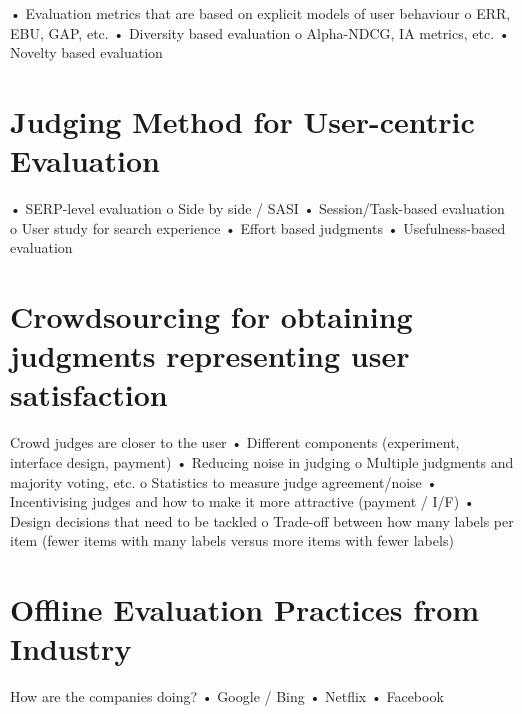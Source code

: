 \documentclass[openany]{now} %
\begin{document}
•	Evaluation metrics that are based on explicit models of user behaviour
	o	ERR, EBU, GAP, etc.
•	Diversity based evaluation
	o	Alpha-NDCG, IA metrics, etc.
•	Novelty based evaluation

\chapter{Judging Method for User-centric Evaluation}
•	SERP-level evaluation 
	o	Side by side / SASI \cite{Chandar2013}
•	Session/Task-based evaluation
	o	User study for search experience
•	Effort based judgments
•	Usefulness-based evaluation

\chapter{Crowdsourcing for obtaining judgments representing user satisfaction}

Crowd judges are closer to the user
•	Different components (experiment, interface design, payment)
•	Reducing noise in judging
	o	Multiple judgments and majority voting, etc.
	o	Statistics to measure judge agreement/noise
•	Incentivising judges and how to make it more attractive (payment / I/F)
•	Design decisions that need to be tackled
	o	Trade-off between how many labels per item 
		(fewer items with many labels versus more items with fewer labels)

\chapter{Offline Evaluation Practices from Industry}
How are the companies doing?
•	Google / Bing
•	Netflix
•	Facebook


\backmatter  %



\end{document}
